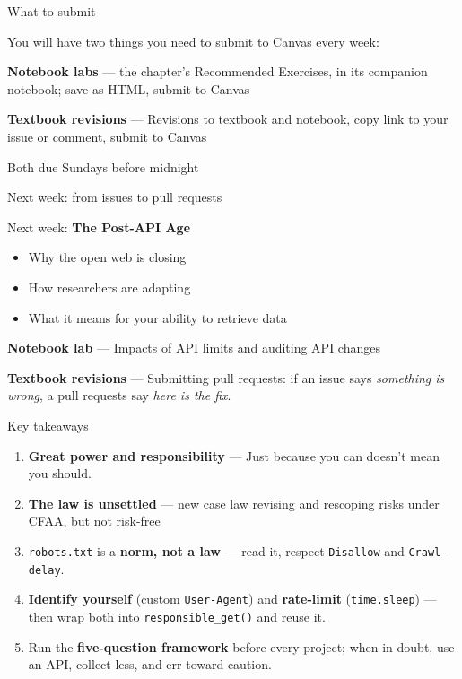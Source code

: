 \documentclass[9pt,aspectratio=169]{beamer}
\begin{document}
\begin{frame}{What to submit}

    You will have two things you need to submit to Canvas every week:

    \medskip

    \textbf{Notebook labs} --- the chapter's Recommended Exercises, in its companion notebook; save as HTML, submit to Canvas

    \medskip

    \textbf{Textbook revisions} --- Revisions to textbook and notebook, copy link to your issue or comment, submit to Canvas

    \medskip

    Both due Sundays before midnight
    
\end{frame}

\begin{frame}{Next week: from issues to pull requests}
    
    Next week: \textbf{The Post-API Age} 
    \begin{itemize}
        \item Why the open web is closing
        \item How researchers are adapting
        \item What it means for your ability to retrieve data
    \end{itemize}

    \textbf{Notebook lab} --- Impacts of API limits and auditing API changes

    \textbf{Textbook revisions} --- Submitting pull requests: if an issue says \textit{something is wrong}, a pull requests say \textit{here is the fix}.

\end{frame}

\begin{frame}{Key takeaways}
    \begin{enumerate}
        \item \textbf{Great power and responsibility} --- Just because you can doesn't mean you should.
        \item \textbf{The law is unsettled} --- new case law revising and rescoping risks under CFAA, but not risk-free
        \item \texttt{robots.txt} is a \textbf{norm, not a law} --- read it, respect \texttt{Disallow} and \texttt{Crawl-delay}.
        \item \textbf{Identify yourself} (custom \texttt{User-Agent}) and \textbf{rate-limit} (\texttt{time.sleep}) --- then wrap both into \texttt{responsible\_get()} and reuse it.
        \item Run the \textbf{five-question framework} before every project; when in doubt, use an API, collect less, and err toward caution.
    \end{enumerate}
    \bigskip
\end{frame}
\end{document}
